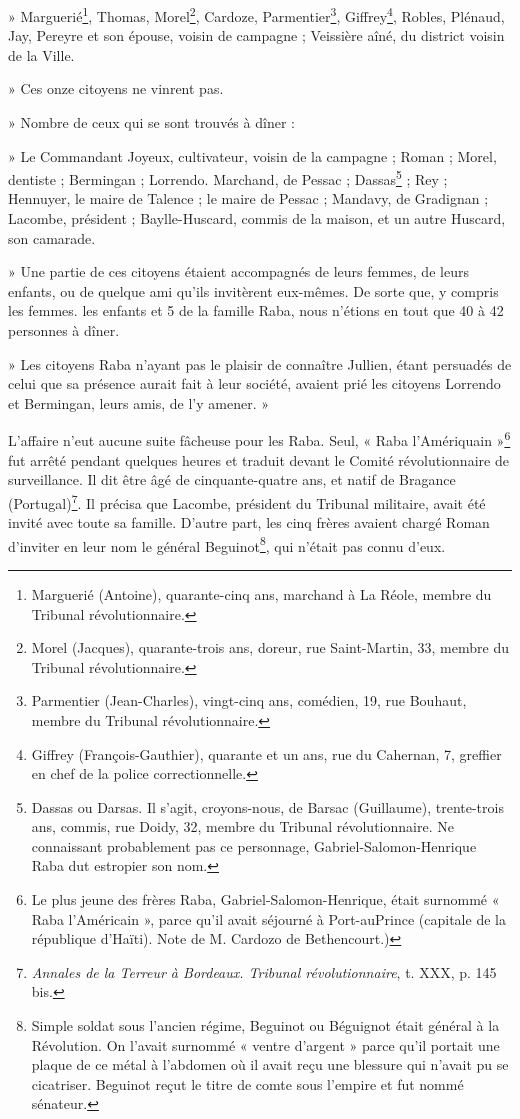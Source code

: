 » Marguerié\footnote{Marguerié (Antoine), quarante-cinq ans, marchand à La Réole, membre du Tribunal révolutionnaire.}, Thomas, Morel\footnote{Morel (Jacques), quarante-trois ans, doreur, rue Saint-Martin, 33, membre du Tribunal révolutionnaire.}, Cardoze, Parmentier\footnote{Parmentier (Jean-Charles), vingt-cinq ans, comédien, 19, rue Bouhaut, membre du Tribunal révolutionnaire.}, Giffrey\footnote{Giffrey (François-Gauthier), quarante et un ans, rue du Cahernan, 7, greffier en chef de la police correctionnelle.}, Robles, Plénaud, Jay, Pereyre et son épouse, voisin de campagne ; Veissière aîné, du district voisin de la Ville.

» Ces onze citoyens ne vinrent pas.

» Nombre de ceux qui se sont trouvés à dîner :

» Le Commandant Joyeux, cultivateur, voisin de la campagne ; Roman ; Morel, dentiste ; Bermingan ; Lorrendo. Marchand, de Pessac ; Dassas\footnote{Dassas ou Darsas. Il s'agit, croyons-nous, de Barsac (Guillaume), trente-trois ans, commis, rue Doidy, 32, membre du Tribunal révolutionnaire. Ne connaissant probablement pas ce personnage, Gabriel-Salomon-Henrique Raba dut estropier son nom.} ; Rey ; Hennuyer, le maire de Talence ; le maire de Pessac ; Mandavy, de Gradignan ; Lacombe, président ; Baylle-Huscard, commis de la maison, et un autre Huscard, son camarade.

» Une partie de ces citoyens étaient accompagnés de leurs femmes, de leurs enfants, ou de quelque ami qu'ils invitèrent eux-mêmes. De sorte que, y compris les femmes. les enfants et 5 de la famille Raba, nous n'étions en tout que 40 à 42 personnes à dîner.

» Les citoyens Raba n'ayant pas le plaisir de connaître Jullien, étant persuadés de celui que sa présence aurait fait à leur société, avaient prié les citoyens Lorrendo et Bermingan, leurs amis, de l'y amener. »

L'affaire n'eut aucune suite fâcheuse pour les Raba. Seul, « Raba l'Amériquain »\footnote{Le plus jeune des frères Raba, Gabriel-Salomon-Henrique, était surnommé « Raba l'Américain », parce qu'il avait séjourné à Port-auPrince (capitale de la république d'Haïti). Note de M. Cardozo de Bethencourt.)} fut arrêté pendant quelques heures et traduit devant le Comité révolutionnaire de surveillance. Il dit être âgé de cinquante-quatre ans, et natif de Bragance (Portugal)\footnote{\textit{Annales de la Terreur à Bordeaux. Tribunal révolutionnaire}, t. XXX, p. 145 bis.}. Il précisa que Lacombe, président du Tribunal militaire, avait été invité avec toute sa famille. D'autre part, les cinq frères avaient chargé Roman d'inviter en leur nom le général Beguinot\footnote{Simple soldat sous l'ancien régime, Beguinot ou Béguignot était général à la Révolution. On l'avait surnommé « ventre d'argent » parce qu'il portait une plaque de ce métal à l'abdomen où il avait reçu une blessure qui n'avait pu se cicatriser. Beguinot reçut le titre de comte sous l'empire et fut nommé sénateur.}, qui n'était pas connu d'eux.

